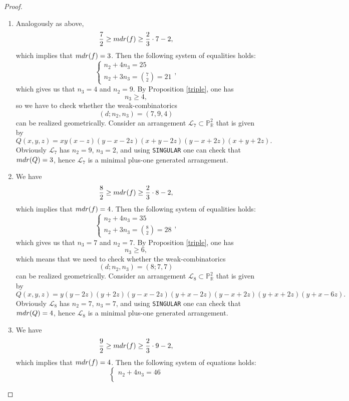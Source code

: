 \documentclass[12pt]{article}
\theoremstyle{plain}
\theoremstyle{definition}
\begin{document}
\begin{proof}
\begin{enumerate}
    Obviously $\mathcal{L}_{6}$ has $n_{2}=9$, $n_{3}=2$, and using \verb}SINGULAR} one can check that ${\rm mdr}(Q)=3$, hence $\mathcal{L}_{6}$ is a minimal plus-one generated arrangement.
    \item[$d=7$:] Analogously as above,
    $$\frac{7}{2} \geq {\rm mdr}(f) \geq \frac{2}{3}\cdot 7-2,$$
    which implies that ${\rm mdr}(f) =3$. Then the following system of equalities holds:\[
    \begin{cases}
      n_{2} + 4n_{3} = 25  \\
      n_{2} + 3n_{3} = \binom{7}{2}=21
    \end{cases},\]
    which gives us that $n_{3}=4$ and $n_{2}=9$.
    By Proposition \ref{triple}, one has
    $$n_{3} \geq 4,$$
    so we have to check whether the weak-combinatorics 
    $$(d;n_{2},n_{3}) = (7,9,4)$$
    can be realized geometrically. Consider an arrangement $\mathcal{L}_{7} \subset \mathbb{P}^{2}_{\mathbb{R}}$ that is given by
    $$Q(x,y,z) = xy(x-z)(y-x-2z)(x+y-2z)(y-x+2z)(x+y+2z).$$
    Obviously $\mathcal{L}_{7}$ has $n_{2}=9$, $n_{3}=2$, and using \verb}SINGULAR} one can check that ${\rm mdr}(Q)=3$, hence $\mathcal{L}_{7}$ is a minimal plus-one generated arrangement.
    \item[$d=8$:] We have
    $$\frac{8}{2} \geq {\rm mdr}(f) \geq \frac{2}{3}\cdot 8-2,$$
    which implies that ${\rm mdr}(f) =4$. Then the following system of equalities holds:\[
    \begin{cases}
      n_{2} + 4n_{3} = 35  \\
      n_{2} + 3n_{3} = \binom{8}{2}=28
    \end{cases},\]
    which gives us that $n_{3}=7$ and $n_{2}=7$.
    By Proposition \ref{triple}, one has
    $$n_{3} \geq 6,$$
    which means that we need to check whether the weak-combinatorics 
    $$(d;n_{2},n_{3}) = (8;7,7)$$
    can be realized geometrically. Consider an arrangement $\mathcal{L}_{8} \subset \mathbb{P}^{2}_{\mathbb{R}}$ that is given by
    $$Q(x,y,z) = y(y-2z)(y+2z)(y-x-2z)(y+x-2z)(y-x+2z)(y+x+2z)(y+x-6z).$$
    Obviously $\mathcal{L}_{8}$ has $n_{2}=7$, $n_{3}=7$, and using \verb}SINGULAR} one can check that ${\rm mdr}(Q)=4$, hence $\mathcal{L}_{8}$ is a minimal plus-one generated arrangement.
    \item[$d=9$:] We have
    $$\frac{9}{2} \geq {\rm mdr}(f) \geq \frac{2}{3}\cdot 9-2,$$
    which implies that ${\rm mdr}(f) = 4$. Then the following system of equations holds:\[
    \begin{cases}
      n_{2} + 4n_{3} = 46  \\

\end{cases}\]
\end{enumerate}
\end{proof}
\end{document}
